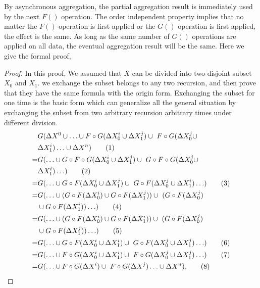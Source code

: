 {By asynchronous aggregation, the partial aggregation result is immediately used by the next $F()$ operation. The order independent property implies that no matter the $F()$ operation is first applied or the $G()$ operation is first applied, the effect is the same. As long as the same number of $G()$ operations are applied on all data, the eventual aggregation result will be the same.%
Here we give the formal proof,

\begin{proof}
	\label{sec:app:proof:correct}
	In this proof, We assumed that $X$ can be divided into two disjoint subset $X_0$ and $X_1$. we exchange the subset belongs to any two  recursion, and then prove that they have the same formula with the origin form. Exchanging the subset for one time is the basic form which can generalize all the general situation by exchanging the subset from two arbitrary recursion arbitrary times under different division.
	\begin{align}
	&G(\Delta X^0\cup \ldots \cup F\circ G(\Delta X^{i}_0 \cup \Delta X^{j}_1)\cup\ F\circ G(\Delta X^{j}_0 \cup \notag\\ &\Delta X^{i}_1) \ldots\cup \Delta X^n)\tag{1} \\
	=&G( \ldots \cup G \circ F\circ G(\Delta X^{i}_0 \cup \Delta X^{{j}}_1)\cup\ G \circ F\circ G(\Delta X^{{j}}_0 \cup \notag\\ &\Delta X^{i}_1) \ldots)\tag{2} \\
	=&G( \ldots \cup G \circ F(\Delta X^{i}_0 \cup \Delta X^{{j}}_1)\cup\ G \circ F(\Delta X^{{j}}_0 \cup \Delta X^{{i}}_1) \ldots)\tag{3} \\
	=&G( \ldots \cup (G\circ F(\Delta X^{i}_0) \cup G\circ F(\Delta X^{{j}}_1))\cup\ (G \circ F(\Delta X^{{j}}_0) \notag\\ &\cup G \circ F(\Delta X^{i}_1)) \ldots )\tag{4} \\
	=&G( \ldots \cup (G\circ F(\Delta X^{i}_0) \cup G\circ F(\Delta X^{i}_1))\cup\ (G \circ F(\Delta X^{{j}}_0) \notag\\ &\cup G  \circ F(\Delta X^{{j}}_1)) \ldots )\tag{5} \\
	=&G( \ldots \cup G \circ F(\Delta X^{i}_0 \cup \Delta X^{{i}}_1)\cup\ G \circ F(\Delta X^{{j}}_0 \cup \Delta X^{{j}}_1) \ldots)\tag{6} \\
	=&G( \ldots \cup F \circ G(\Delta X^{i}_0 \cup \Delta X^{{i}}_1)\cup\ F \circ G(\Delta X^{{j}}_0 \cup \Delta X^{{j}}_1) \ldots)\tag{7} \\
	=&G(\ldots \cup F \circ G(\Delta X^i)\cup\ F \circ G(\Delta X^{j}) \ldots\cup \Delta X^n).\tag{8}
	\end{align}
	

\end{proof}}
